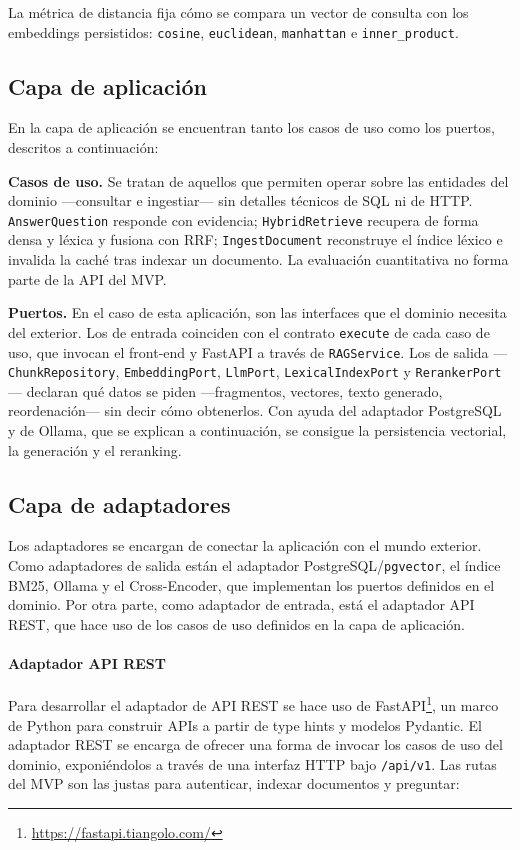 La métrica de distancia fija cómo se compara un vector de consulta con los embeddings persistidos: \texttt{cosine}, \texttt{euclidean}, \texttt{manhattan} e \texttt{inner\_product}.

\subsection{Capa de aplicación}
En la capa de aplicación se encuentran tanto los casos de uso como los puertos, descritos a continuación:

\textbf{Casos de uso.} Se tratan de aquellos que permiten operar sobre las entidades del dominio ---consultar e ingestiar--- sin detalles técnicos de SQL ni de HTTP. \texttt{AnswerQuestion} responde con evidencia; \texttt{HybridRetrieve} recupera de forma densa y léxica y fusiona con RRF; \texttt{IngestDocument} reconstruye el índice léxico e invalida la caché tras indexar un documento. La evaluación cuantitativa no forma parte de la API del MVP.

\textbf{Puertos.} En el caso de esta aplicación, son las interfaces que el dominio necesita del exterior. Los de entrada coinciden con el contrato \texttt{execute} de cada caso de uso, que invocan el front-end y FastAPI a través de \texttt{RAGService}. Los de salida --- \texttt{ChunkRepository}, \texttt{EmbeddingPort}, \texttt{LlmPort}, \texttt{LexicalIndexPort} y \texttt{RerankerPort} --- declaran qué datos se piden ---fragmentos, vectores, texto generado, reordenación--- sin decir cómo obtenerlos. Con ayuda del adaptador PostgreSQL y de Ollama, que se explican a continuación, se consigue la persistencia vectorial, la generación y el reranking.

\subsection{Capa de adaptadores}
Los adaptadores se encargan de conectar la aplicación con el mundo exterior. Como adaptadores de salida están el adaptador PostgreSQL/\texttt{pgvector}, el índice BM25, Ollama y el Cross-Encoder, que implementan los puertos definidos en el dominio. Por otra parte, como adaptador de entrada, está el adaptador API REST, que hace uso de los casos de uso definidos en la capa de aplicación.

\paragraph{Adaptador API REST}
Para desarrollar el adaptador de API REST se hace uso de FastAPI\footnote{\url{https://fastapi.tiangolo.com/}}, un marco de Python para construir APIs a partir de type hints y modelos Pydantic. El adaptador REST se encarga de ofrecer una forma de invocar los casos de uso del dominio, exponiéndolos a través de una interfaz HTTP bajo \texttt{/api/v1}. Las rutas del MVP son las justas para autenticar, indexar documentos y preguntar:

